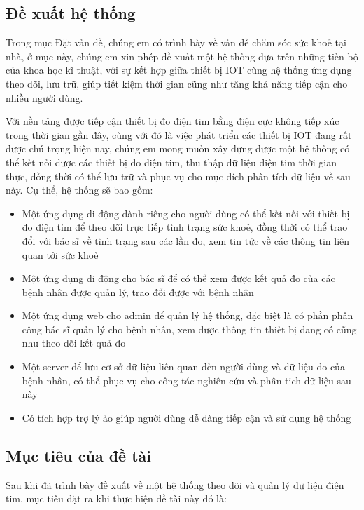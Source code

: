 \subsection*{Đề xuất hệ thống}

Trong mục Đặt vấn đề, chúng em có trình bày về vấn đề chăm sóc sức khoẻ tại nhà, ở mục này, chúng em xin phép đề xuất một hệ thống
dựa trên những tiến bộ của khoa học kĩ thuật, với sự kết hợp giữa thiết bị IOT cùng hệ thống ứng dụng theo dõi, lưu trữ,
giúp tiết kiệm thời gian cũng như tăng khả năng tiếp cận cho nhiều người dùng. 

Với nền tảng được tiếp cận thiết bị đo điện tim bằng điện cực không tiếp xúc trong thời gian gần đây, 
cùng với đó là việc phát triển các thiết bị IOT đang rất được chú trọng hiện nay, chúng em mong muốn xây dựng được một hệ thống
có thể kết nối được các thiết bị đo điện tim, thu thập dữ liệu điện tim thời gian thực, đồng thời có thể lưu trữ và phục vụ cho mục đích
phân tích dữ liệu về sau này. Cụ thể, hệ thống sẽ bao gồm:

\begin{adjustwidth}{1.5em}{}
  \begin{itemize}
      \item Một ứng dụng di động dành riêng cho người dùng có thể kết nối với thiết bị đo điện tim để theo dõi trực tiếp tình trạng sức khoẻ, đồng
      thời có thể trao đổi với bác sĩ về tình trạng sau các lần đo, xem tin tức về các thông tin liên quan tới sức khoẻ
      \item Một ứng dụng di động cho bác sĩ để có thể xem được kết quả đo của các bệnh nhân được quản lý, trao đổi được với bệnh nhân
      \item Một ứng dụng web cho admin để quản lý hệ thống, đặc biệt là có phần phân công bác sĩ quản lý cho bệnh nhân, xem được thông tin thiết bị đang có cũng như theo dõi kết quả đo
      \item Một server để lưu cơ sở dữ liệu liên quan đến người dùng và dữ liệu đo của bệnh nhân, có thể phục vụ cho công tác nghiên cứu và
      phân tich dữ liệu sau này
      \item Có tích hợp trợ lý ảo giúp người dùng dễ dàng tiếp cận và sử dụng hệ thống
  \end{itemize}
  \end{adjustwidth}


\subsection*{Mục tiêu của đề tài}
Sau khi đã trình bày đề xuất về một hệ thống theo dõi và quản lý dữ liệu điện tim, mục tiêu đặt ra khi thực hiện
đề tài này đó là:

